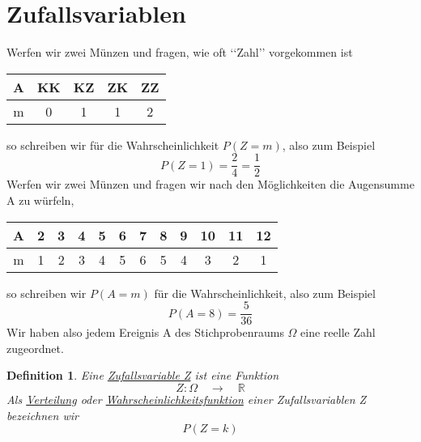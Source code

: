 \documentclass{report}
\newtheorem{mydef}{Definition}
\begin{document}
\section{Zufallsvariablen}
Werfen wir zwei Münzen und fragen, wie oft \lq\lq{}Zahl\rq\rq{} vorgekommen ist
\begin{center}\begin{tabular}{c | c c c c}
A & KK & KZ & ZK & ZZ\\
\hline
m & 0 & 1 & 1 & 2
\end{tabular}\end{center}
so schreiben wir für die Wahrscheinlichkeit $P(Z=m)$, also zum Beispiel
\begin{equation}
P(Z=1) = \frac{2}{4} = \frac{1}{2}
\end{equation}
Werfen wir zwei Münzen und fragen wir nach den Möglichkeiten die Augensumme A zu würfeln,
\begin{center}\begin{tabular}{c | c c c c c c c c c c c}
A & 2 & 3 & 4 & 5 & 6 & 7 & 8 & 9 & 10 & 11 & 12\\
\hline
m & 1 & 2 & 3 & 4 & 5 & 6 & 5 & 4 & 3 & 2 & 1
\end{tabular}\end{center}
so schreiben wir $P(A=m)$ für die Wahrscheinlichkeit, also zum Beispiel
\begin{equation}
P(A=8) = \frac{5}{36}
\end{equation}
Wir haben also jedem Ereignis A des Stichprobenraums $\Omega$ eine reelle Zahl zugeordnet.
\begin{mydef}
Eine \underline{Zufallsvariable Z} ist eine Funktion
\begin{equation}
Z: \Omega \quad \longrightarrow \quad \mathbb{R}
\end{equation}
Als \underline{Verteilung} oder \underline{Wahrscheinlichkeitsfunktion} einer Zufallsvariablen Z bezeichnen wir
\begin{equation}
P(Z=k)
\end{equation}
\end{mydef}
\end{document}
